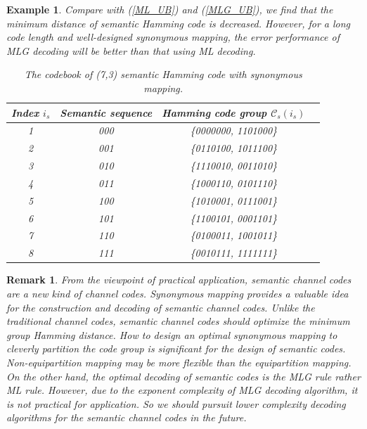 \documentclass[12pt, draftclsnofoot,onecolumn]{IEEEtran}
\newtheorem{remark}{\bf{Remark}}
\newtheorem{example}{\bf{Example}}
\begin{document}
\begin{example}
Compare with (\ref{ML_UB}) and (\ref{MLG_UB}), we find that the minimum distance of semantic Hamming code is decreased. However, for a long code length and well-designed synonymous mapping, the error performance of MLG decoding will be better than that using ML decoding.

\begin{table}[tp]
\centering
\caption{The codebook of (7,3) semantic Hamming code with synonymous mapping.} \label{Semantic_Hammingcode}
\begin{tabular}{|c|c|c|c|}
  \hline Index $i_s$ &  Semantic sequence   & Hamming code group $\mathcal{C}_s(i_s)$   \\
  \hline         1         &             000               &           \{0000000,   1101000\}           \\
  \hline         2         &             001               &           \{0110100,   1011100\}           \\
  \hline         3         &             010               &           \{1110010,   0011010\}          \\
  \hline         4         &             011               &           \{1000110,   0101110\}           \\
  \hline         5         &             100               &           \{1010001,   0111001\}          \\
  \hline         6         &             101               &           \{1100101,   0001101\}           \\
  \hline         7         &             110               &           \{0100011,   1001011\}           \\
  \hline         8         &             111               &           \{0010111,   1111111\}           \\
  \hline
\end{tabular}
\end{table}
\end{example}

\begin{remark}
From the viewpoint of practical application, semantic channel codes are a new kind of channel codes. Synonymous mapping provides a valuable idea for the construction and decoding of semantic channel codes. Unlike the traditional channel codes, semantic channel codes should optimize the minimum group Hamming distance. How to design an optimal synonymous mapping to cleverly partition the code group is significant for the design of semantic codes. Non-equipartition mapping may be more flexible than the equipartition mapping. On the other hand, the optimal decoding of semantic codes is the MLG rule rather ML rule. However, due to the exponent complexity of MLG decoding algorithm, it is not practical for application. So we should pursuit lower complexity decoding algorithms for the semantic channel codes in the future.
\end{remark}
\end{document}
